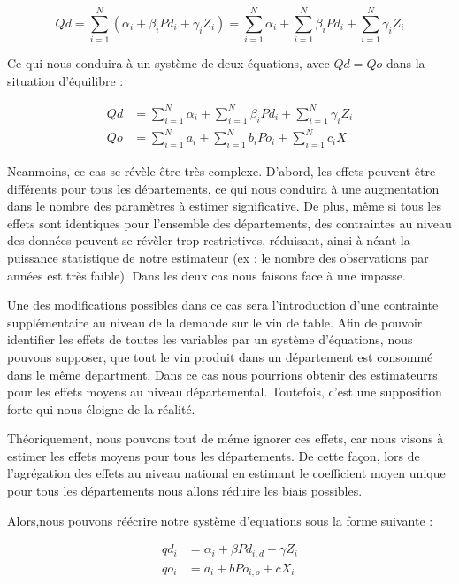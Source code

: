 \documentclass[11pt,]{article}
\begin{document}
\begin{equation*}
    Qd = \sum_{i = 1}^{N} ( \alpha_i + \beta_i Pd_i + \gamma_i Z_i ) = \sum_{i = 1}^{N} \alpha_i + \sum_{i = 1}^{N} \beta_i Pd_i + \sum_{i = 1}^{N} \gamma_i Z_i
\end{equation*}

Ce qui nous conduira à un système de deux équations, avec \(Qd = Qo\)
dans la situation d'équilibre :

\begin{align*}
    Qd & = \sum_{i = 1}^{N} \alpha_i + \sum_{i = 1}^{N} \beta_i Pd_i + \sum_{i = 1}^{N} \gamma_i Z_i \\
    Qo & = \sum_{i = 1}^{N} a_i + \sum_{i = 1}^{N} b_i Po_i + \sum_{i = 1}^{N} c_i X
\end{align*}

Neanmoins, ce cas se révèle être très complexe. D'abord, les effets
peuvent être différents pour tous les départements, ce qui nous conduira
à une augmentation dans le nombre des paramètres à estimer
significative. De plus, même si tous les effets sont identiques pour
l'ensemble des départements, des contraintes au niveau des données
peuvent se révèler trop restrictives, réduisant, ainsi à néant la
puissance statistique de notre estimateur (ex : le nombre des
observations par années est très faible). Dans les deux cas nous faisons
face à une impasse.

Une des modifications possibles dans ce cas sera l'introduction d'une
contrainte supplémentaire au niveau de la demande sur le vin de table.
Afin de pouvoir identifier les effets de toutes les variables par un
système d'équations, nous pouvons supposer, que tout le vin produit dans
un département est consommé dans le même department. Dans ce cas nous
pourrions obtenir des estimateurrs pour les effets moyens au niveau
départemental. Toutefois, c'est une supposition forte qui nous éloigne
de la réalité.

Théoriquement, nous pouvons tout de méme ignorer ces effets, car nous
visons à estimer les effets moyens pour tous les départements. De cette
façon, lors de l'agrégation des effets au niveau national en estimant le
coefficient moyen unique pour tous les départements nous allons réduire
les biais possibles.

Alors,nous pouvons réécrire notre système d'equations sous la forme
suivante :

\begin{align*}
  qd_i & = \alpha_{i} + \beta Pd_{i,d} + \gamma Z_{i} \\
  qo_i & = a_i + b Po_{i,o} + c X_{i} \\ 
\end{align*}
\end{document}
